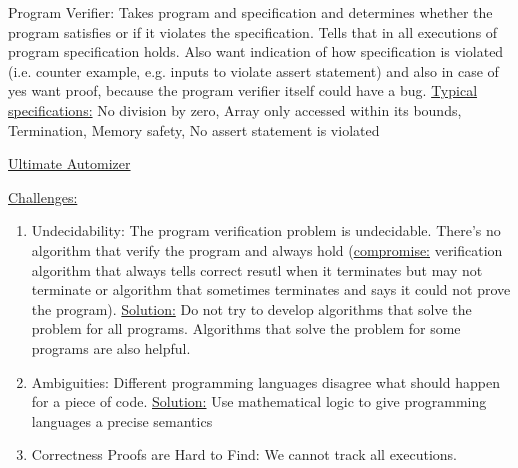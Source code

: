 \documentclass[landscape, a4paper]{article}
\begin{document}
\fontsize{3pt}{3pt}\selectfont

\begin{minipage}[t]{0.2\linewidth}
	  
	\begin{betterlist}
		\item \alert{Program Verifier:} Takes program and specification and determines whether the program satisfies or if it violates the specification. Tells that in all executions of program specification holds. Also want indication of how specification is violated (i.e. counter example, e.g. inputs to violate assert statement) and also in case of yes want proof, because the program verifier itself could have a bug. \underline{Typical specifications:} No division by zero, Array only accessed within its bounds, Termination, Memory safety, No assert statement is violated
		\item \href{https://ultimate-pa.org/?ui=tool&tool=automizer}{Ultimate Automizer}
		\item \underline{Challenges:}
		\begin{enumerate}
			\item \alert{Undecidability:} The program verification problem is undecidable. There's no algorithm that verify the program and always hold (\underline{compromise:} verification algorithm that always tells correct resutl when it terminates but may not terminate or algorithm that sometimes terminates and says it could not prove the program). \underline{Solution:} Do not try to develop algorithms that solve the problem for all programs. Algorithms that solve the problem for some programs are also helpful.
			\item \alert{Ambiguities:} Different programming languages disagree what should happen for a piece of code. \underline{Solution:} Use mathematical logic to give programming languages a precise semantics
			\item \alert{Correctness Proofs are Hard to Find:} We cannot track all executions.
		\end{enumerate}
	\end{betterlist}
	  

\end{minipage}
\end{document}
